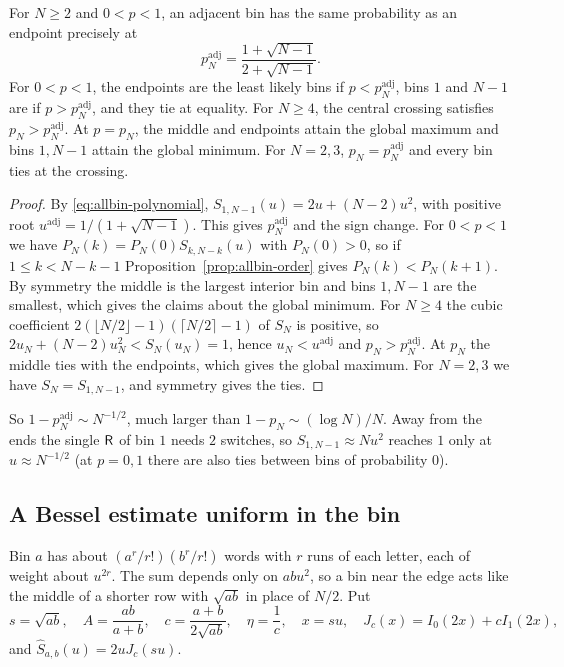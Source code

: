\begin{proposition}\label{prop:adjacent}
For $N\ge2$ and $0<p<1$, an adjacent bin has the same probability as an endpoint precisely at
\[
p_N^{\mathrm{adj}}=\frac{1+\sqrt{N-1}}{2+\sqrt{N-1}}.
\]
For $0<p<1$, the endpoints are the least likely bins if $p<p_N^{\mathrm{adj}}$, bins
$1$ and $N-1$ are if $p>p_N^{\mathrm{adj}}$, and they tie at equality.
For $N\ge4$, the central crossing satisfies $p_N>p_N^{\mathrm{adj}}$.
At $p=p_N$, the middle and endpoints attain the global maximum and bins
$1,N-1$ attain the global minimum. For $N=2,3$,
$p_N=p_N^{\mathrm{adj}}$ and every bin ties at the crossing.
\end{proposition}
\begin{proof}
By \eqref{eq:allbin-polynomial}, $S_{1,N-1}(u)=2u+(N-2)u^2$, with positive root
$u^{\mathrm{adj}}=1/(1+\sqrt{N-1})$. This gives $p_N^{\mathrm{adj}}$ and the sign
change. For $0<p<1$ we have $P_N(k)=P_N(0)S_{k,N-k}(u)$ with $P_N(0)>0$, so if
$1\le k<N-k-1$ Proposition~\ref{prop:allbin-order} gives $P_N(k)<P_N(k+1)$. By
symmetry the middle is the largest interior bin and bins $1,N-1$ are the
smallest, which gives the claims about the global minimum. For $N\ge4$ the
cubic coefficient $2(\lfloor N/2\rfloor-1)(\lceil N/2\rceil-1)$ of $S_N$ is
positive, so $2u_N+(N-2)u_N^2<S_N(u_N)=1$, hence $u_N<u^{\mathrm{adj}}$ and
$p_N>p_N^{\mathrm{adj}}$. At $p_N$ the middle ties with the endpoints, which
gives the global maximum. For $N=2,3$ we have $S_N=S_{1,N-1}$, and symmetry
gives the ties.
\end{proof}

So $1-p_N^{\mathrm{adj}}\sim N^{-1/2}$, much larger than $1-p_N\sim(\log N)/N$.
Away from the ends the single $\mathsf R$ of bin $1$ needs $2$ switches, so
$S_{1,N-1}\approx Nu^2$ reaches $1$ only at $u\approx N^{-1/2}$ (at $p=0,1$
there are also ties between bins of probability $0$).

\subsection{A Bessel estimate uniform in the bin}

Bin $a$ has about $(a^r/r!)(b^r/r!)$ words with $r$ runs of each letter, each
of weight about $u^{2r}$. The sum depends only on $abu^2$, so a bin near the
edge acts like the middle of a shorter row with $\sqrt{ab}$ in place of $N/2$.
Put
\[
 s=\sqrt{ab},\quad A=\frac{ab}{a+b},\quad
 c=\frac{a+b}{2\sqrt{ab}},\quad
 \eta=\frac1c,\quad x=su,\quad J_c(x)=I_0(2x)+cI_1(2x),
\]
and $\widehat S_{a,b}(u)=2uJ_c(su)$.

